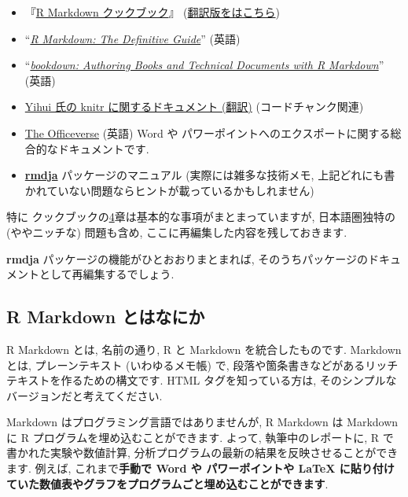 \documentclass[
]{ltjsarticle}
\providecommand{\tightlist}{%
  \setlength{\itemsep}{0pt}\setlength{\parskip}{0pt}}
\begin{document}
\begin{itemize}
\tightlist
\item
  \citet{xie2020Markdowna}『\href{https://bookdown.org/yihui/rmarkdown-cookbook/}{R Markdown クックブック}』 (\href{https://gedevan-aleksizde.github.io/rmarkdown-cookbook/}{翻訳版をはこちら})
\item
  \citet{xie2019Markdown} ``\href{https://bookdown.org/yihui/rmarkdown/markdown-syntax.html}{\emph{R Markdown: The Definitive Guide}}'' (英語)
\item
  \citet{R-bookdown} ``\href{https://bookdown.org/yihui/bookdown/}{\emph{bookdown: Authoring Books and Technical Documents with R Markdown}}'' (英語)
\item
  \href{https://gedevan-aleksizde.github.io/knitr-doc-ja/index.html}{Yihui 氏の knitr に関するドキュメント (翻訳)} (コードチャンク関連)
\item
  \href{https://ardata-fr.github.io/officeverse/}{The Officeverse} (英語) Word や パワーポイントへのエクスポートに関する総合的なドキュメントです.
\item
  \href{https://github.com/Gedevan-Aleksizde/rmdja}{\textbf{rmdja}} パッケージのマニュアル (実際には雑多な技術メモ, 上記どれにも書かれていない問題ならヒントが載っているかもしれません)
\end{itemize}

特に クックブックの\href{https://gedevan-aleksizde.github.io/rmarkdown-cookbook/document-elements.html}{4}章は基本的な事項がまとまっていますが, 日本語圏独特の (ややニッチな) 問題も含め, ここに再編集した内容を残しておきます.

\textbf{rmdja} パッケージの機能がひとおおりまとまれば, そのうちパッケージのドキュメントとして再編集するでしょう.

\hypertarget{r-markdown-ux3068ux306fux306aux306bux304b}{%
\subsection*{R Markdown とはなにか}\label{r-markdown-ux3068ux306fux306aux306bux304b}}

R Markdown とは, 名前の通り, R と Markdown を統合したものです. Markdown とは, プレーンテキスト (いわゆるメモ帳) で, 段落や箇条書きなどがあるリッチテキストを作るための構文です. HTML タグを知っている方は, そのシンプルなバージョンだと考えてください.

Markdown はプログラミング言語ではありませんが, R Markdown は Markdown に R プログラムを埋め込むことができます. よって, 執筆中のレポートに, R で書かれた実験や数値計算, 分析プログラムの最新の結果を反映させることができます. 例えば, これまで\textbf{手動で Word や パワーポイントや LaTeX に貼り付けていた数値表やグラフをプログラムごと埋め込むことができます}.
\end{document}
